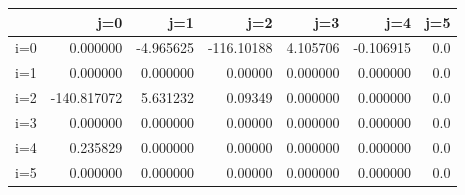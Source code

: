 \begin{tabular}{lrrrrrr}
\toprule
{} &         j=0 &       j=1 &        j=2 &       j=3 &       j=4 &  j=5 \\
\midrule
i=0 &    0.000000 & -4.965625 & -116.10188 &  4.105706 & -0.106915 &  0.0 \\
i=1 &    0.000000 &  0.000000 &    0.00000 &  0.000000 &  0.000000 &  0.0 \\
i=2 & -140.817072 &  5.631232 &    0.09349 &  0.000000 &  0.000000 &  0.0 \\
i=3 &    0.000000 &  0.000000 &    0.00000 &  0.000000 &  0.000000 &  0.0 \\
i=4 &    0.235829 &  0.000000 &    0.00000 &  0.000000 &  0.000000 &  0.0 \\
i=5 &    0.000000 &  0.000000 &    0.00000 &  0.000000 &  0.000000 &  0.0 \\
\bottomrule
\end{tabular}

